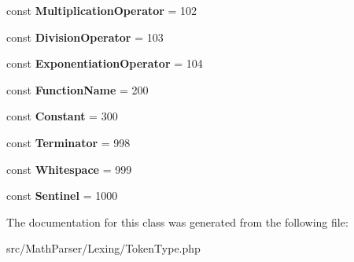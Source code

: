 \begin{DoxyCompactItemize}
\item 
\hypertarget{classMathParser_1_1Lexing_1_1TokenType_a22f44105eb54160a2ac341353584d98b}{const {\bfseries Multiplication\-Operator} = 102}\label{classMathParser_1_1Lexing_1_1TokenType_a22f44105eb54160a2ac341353584d98b}

\item 
\hypertarget{classMathParser_1_1Lexing_1_1TokenType_a1f22a48898b44dd9378671ff973fe6cf}{const {\bfseries Division\-Operator} = 103}\label{classMathParser_1_1Lexing_1_1TokenType_a1f22a48898b44dd9378671ff973fe6cf}

\item 
\hypertarget{classMathParser_1_1Lexing_1_1TokenType_aa34bf64ad7e2a4ca5e4daee472803a9e}{const {\bfseries Exponentiation\-Operator} = 104}\label{classMathParser_1_1Lexing_1_1TokenType_aa34bf64ad7e2a4ca5e4daee472803a9e}

\item 
\hypertarget{classMathParser_1_1Lexing_1_1TokenType_aeb6530d03816a7a49bc7a4ce966b5f86}{const {\bfseries Function\-Name} = 200}\label{classMathParser_1_1Lexing_1_1TokenType_aeb6530d03816a7a49bc7a4ce966b5f86}

\item 
\hypertarget{classMathParser_1_1Lexing_1_1TokenType_ab66dae0c8da201d9b9dab1ff3b0eb34a}{const {\bfseries Constant} = 300}\label{classMathParser_1_1Lexing_1_1TokenType_ab66dae0c8da201d9b9dab1ff3b0eb34a}

\item 
\hypertarget{classMathParser_1_1Lexing_1_1TokenType_a43833be0fe13432efa8cfd5d5e5e8f2a}{const {\bfseries Terminator} = 998}\label{classMathParser_1_1Lexing_1_1TokenType_a43833be0fe13432efa8cfd5d5e5e8f2a}

\item 
\hypertarget{classMathParser_1_1Lexing_1_1TokenType_a4011bcee869dd640cd7b2818282ef23b}{const {\bfseries Whitespace} = 999}\label{classMathParser_1_1Lexing_1_1TokenType_a4011bcee869dd640cd7b2818282ef23b}

\item 
\hypertarget{classMathParser_1_1Lexing_1_1TokenType_a78d79415633ade3f490659424d688d2e}{const {\bfseries Sentinel} = 1000}\label{classMathParser_1_1Lexing_1_1TokenType_a78d79415633ade3f490659424d688d2e}

\end{DoxyCompactItemize}


The documentation for this class was generated from the following file\-:\begin{DoxyCompactItemize}
\item 
src/\-Math\-Parser/\-Lexing/Token\-Type.\-php\end{DoxyCompactItemize}
